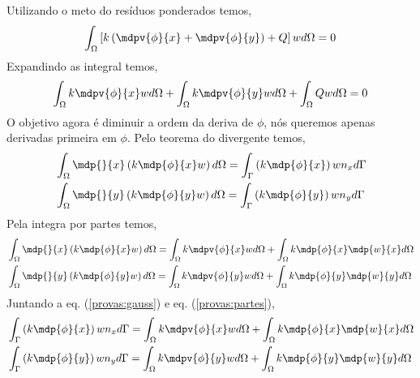 Utilizando o meto do resíduos ponderados temos,
%
\begin{equation}
	\int_{\Omega} \left[k \left(\mdpv{\phi}{x} + \mdpv{\phi}{y}\right) + Q\right]w d\Omega = 0	
\end{equation}
%
Expandindo as integral temos,
%
\begin{equation}
	\int_{\Omega} k \mdpv{\phi}{x} w d\Omega + \int_{\Omega} k \mdpv{\phi}{y} w d\Omega + \int_{\Omega} Q w d\Omega = 0
	\label{provas:passo_intermediario}
\end{equation}
%
O objetivo agora é diminuir a ordem da deriva de $\phi$, nós queremos apenas derivadas primeira em $\phi$. Pelo teorema do divergente temos,
%
\begin{equation}
	\begin{split}
	&\int_{\Omega} \mdp{} {x} \left( k \mdp{\phi}{x} w \right) d\Omega = \int_{\Gamma} \left(k \mdp{\phi}{x}\right) w n_x d\Gamma\\
	&\int_{\Omega} \mdp{} {y} \left( k \mdp{\phi}{y} w \right) d\Omega = \int_{\Gamma} \left(k \mdp{\phi}{y}\right) w n_y d\Gamma
    \end{split}
	\label{provas:gauss}
\end{equation}
%
Pela integra por partes temos,
%
\begin{equation}
	\begin{split}
	&\int_{\Omega} \mdp{} {x} \left( k \mdp{\phi}{x} w \right) d\Omega = \int_{\Omega} k \mdpv{\phi}{x} w d\Omega + \int_{\Omega} k \mdp{\phi}{x} \mdp{w} {x}  d\Omega\\
	&\int_{\Omega} \mdp{} {y} \left( k \mdp{\phi}{y} w \right) d\Omega = \int_{\Omega} k \mdpv{\phi}{y} w d\Omega + \int_{\Omega} k \mdp{\phi}{y} \mdp{w} {y}  d\Omega\\
	\end{split}
	\label{provas:partes}
\end{equation}
%
Juntando a eq. (\ref{provas:gauss}) e eq. (\ref{provas:partes}),
%
\begin{equation}
	\begin{split}
		&\int_{\Gamma} \left(k \mdp{\phi}{x}\right) w n_x d\Gamma = \int_{\Omega} k \mdpv{\phi}{x} w d\Omega + \int_{\Omega} k \mdp{\phi}{x} \mdp{w} {x}  d\Omega\\
		&\int_{\Gamma} \left(k \mdp{\phi}{y}\right) w n_y d\Gamma = \int_{\Omega} k \mdpv{\phi}{y} w d\Omega + \int_{\Omega} k \mdp{\phi}{y} \mdp{w} {y}  d\Omega\\
	\end{split}
\end{equation}
